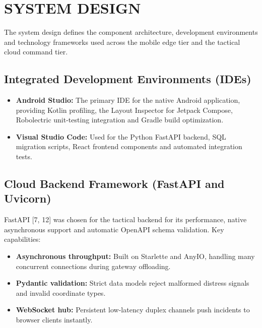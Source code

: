 \documentclass[12pt,a4paper]{report}
\begin{document}
\chapter{SYSTEM DESIGN}

The system design defines the component architecture, development environments and technology frameworks used across the mobile edge tier and the tactical cloud command tier.

\section{Integrated Development Environments (IDEs)}
\begin{itemize}
    \item \textbf{Android Studio:} The primary IDE for the native Android application, providing Kotlin profiling, the Layout Inspector for Jetpack Compose, Robolectric unit-testing integration and Gradle build optimization.
    \item \textbf{Visual Studio Code:} Used for the Python FastAPI backend, SQL migration scripts, React frontend components and automated integration tests.
\end{itemize}

\section{Cloud Backend Framework (FastAPI and Uvicorn)}
FastAPI [7, 12] was chosen for the tactical backend for its performance, native asynchronous support and automatic OpenAPI schema validation. Key capabilities:
\begin{itemize}
    \item \textbf{Asynchronous throughput:} Built on Starlette and AnyIO, handling many concurrent connections during gateway offloading.
    \item \textbf{Pydantic validation:} Strict data models reject malformed distress signals and invalid coordinate types.
    \item \textbf{WebSocket hub:} Persistent low-latency duplex channels push incidents to browser clients instantly.
\end{itemize}
\end{document}
